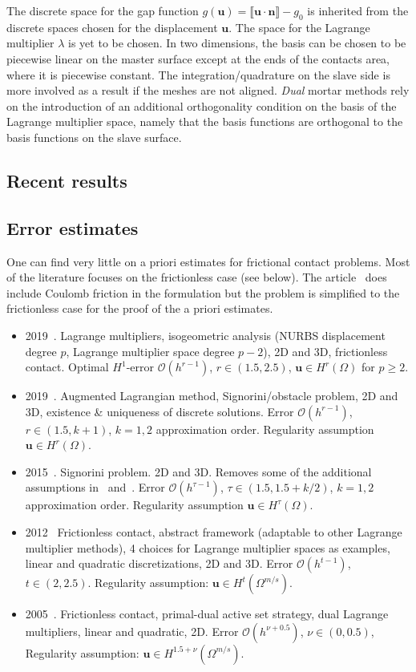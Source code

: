 \documentclass[12pt]{article}
\newcommand{\mbf}[1]{\mathbf{#1}}
\newcommand{\mbn}{\mbf{n}}
\newcommand{\mbu}{\mbf{u}}
\newcommand{\jump}[1]{\llbracket #1 \rrbracket}
\begin{document}
The discrete space for the gap function $g(\mbu) = \jump{\mbu \cdot \mbn} -g_0$ is inherited from the discrete spaces chosen for the displacement $\mbu$.  The space for the Lagrange
multiplier $\lambda$ is yet to be chosen. In two dimensions, the basis can be chosen to be piecewise linear on the master surface except at the ends of the contacts area, where it is piecewise constant.
The integration/quadrature on the slave side is more involved as a result if the meshes are not aligned. 
\emph{Dual} mortar methods rely on the introduction of an additional orthogonality condition on the basis of the Lagrange multiplier space, namely that the basis functions are orthogonal to the basis functions on the slave surface.

\subsection{Recent results}
\subsection{Error estimates}
One can find very little on a priori estimates for frictional contact problems. 
Most of the literature focuses on the frictionless case (see below).
The article~\cite{wohlmuth2012abstract} does include Coulomb friction in the formulation but the problem is simplified to the frictionless case for the proof of the a priori estimates.
\begin{itemize}
  \item 2019~\cite{antolin2019priori}. Lagrange multipliers, isogeometric analysis (NURBS displacement degree $p$, Lagrange multiplier space degree $p-2$), 2D and 3D, frictionless contact. Optimal $H^1$-error $\mathcal{O}(h^{r-1})$, $r \in (1.5, 2.5)$, $\bm u \in H^r(\Omega)$ for $p \geq 2$.
  \item 2019~\cite{burman2019augmented}. Augmented Lagrangian method, Signorini/obstacle problem, 2D and 3D, existence \& uniqueness of discrete solutions. Error $\mathcal{O}(h^{r-1})$, $r \in (1.5, k+1)$, $k=1,2$ approximation order. Regularity assumption $\bm u \in H^r(\Omega)$.
  \item 2015~\cite{drouet2015optimal}. Signorini problem. 2D and 3D. Removes some of the additional assumptions in~\cite{hueber2005priori} and~\cite{wohlmuth2012abstract}.
   Error $\mathcal{O}(h^{\tau-1})$, $\tau \in (1.5, 1.5+k/2)$, $k=1,2$ approximation order. Regularity assumption $\bm u \in H^{\tau}(\Omega)$.
  \item 2012~\cite{wohlmuth2012abstract} Frictionless contact, abstract framework (adaptable to other Lagrange multiplier methods), 4 choices for Lagrange multiplier spaces as examples, linear and quadratic discretizations, 2D and 3D. Error $\mathcal{O}(h^{t-1})$, $t \in (2,2.5)$. Regularity assumption: $\bm u \in H^t(\Omega^{m/s})$.
  \item 2005~\cite{hueber2005priori}. Frictionless contact, primal-dual active set strategy, dual Lagrange multipliers, linear and quadratic, 2D. Error $\mathcal{O}(h^{\nu + 0.5})$, $\nu \in (0, 0.5)$, Regularity assumption: $\bm u \in H^{1.5+\nu}(\Omega^{m/s})$.
\end{itemize}
\end{document}

